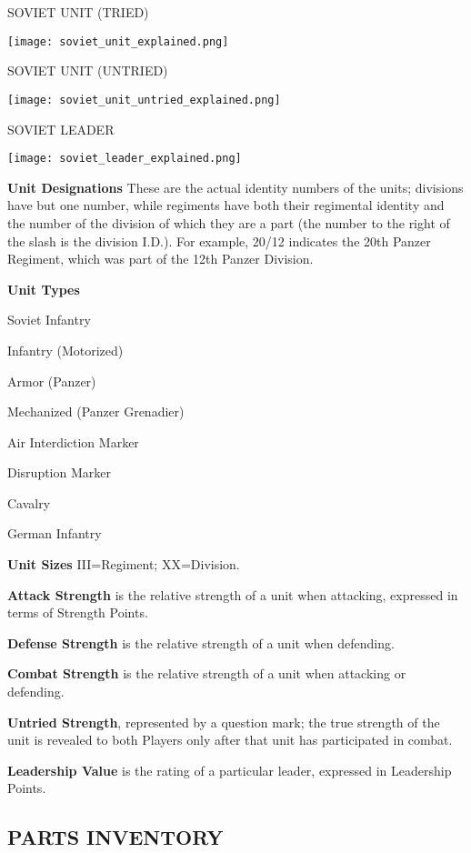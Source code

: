 SOVIET UNIT (TRIED)

\begin{center}
  \texttt{[image: soviet\_unit\_explained.png]}
\end{center}

SOVIET UNIT (UNTRIED)

\begin{center}
  \texttt{[image: soviet\_unit\_untried\_explained.png]}
\end{center}

SOVIET LEADER

\begin{center}
  \texttt{[image: soviet\_leader\_explained.png]}
\end{center}

\textbf{Unit Designations}
These are the actual identity numbers of the units; divisions have but one number, while regiments have both their regimental identity and the number of the division of which they are a part (the number to the right of the slash is the division I.D.). For example, 20/12 indicates the 20th Panzer Regiment, which was part of the 12th Panzer Division.

\textbf{Unit Types}

Soviet Infantry

Infantry (Motorized)

Armor (Panzer)

Mechanized (Panzer Grenadier)

Air Interdiction Marker

Disruption Marker

Cavalry

German Infantry

\textbf{Unit Sizes}
III=Regiment; XX=Division.

\textbf{Attack Strength} is the relative strength of a unit when attacking, expressed in terms of Strength Points.

\textbf{Defense Strength} is the relative strength of a unit when defending.

\textbf{Combat Strength} is the relative strength of a unit when attacking or defending.

\textbf{Untried Strength}, represented by a question mark; the true strength of the unit is revealed to both Players only after that unit has participated in combat.

\textbf{Leadership Value} is the rating of a particular leader, expressed in Leadership Points.

\subsection{PARTS INVENTORY}

